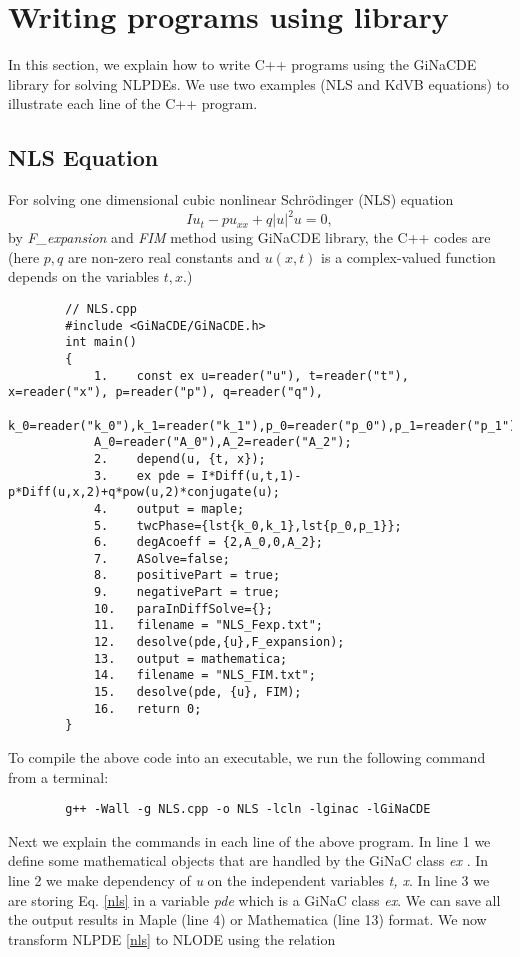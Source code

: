 \documentclass[prd,aps,floats,showkeys,nofootinbib,notitlepage]{revtex4}
\begin{document}
	\section{Writing programs using library}\label{sec:examples} 
	In this section, we explain how to write C++ programs using the GiNaCDE library for solving NLPDEs. We use two examples (NLS and KdVB equations) to illustrate each line of the C++ program.
	\subsection{NLS Equation}
	For solving one dimensional cubic nonlinear Schrödinger (NLS) equation %
	\begin{equation}\label{nls}
		Iu_t-pu_{xx}+q{|u|}^2u=0,
	\end{equation}
	by {\em F\_expansion} and {\em FIM} method using GiNaCDE library, the C++ codes are (here $p,q$ are non-zero real constants and $u(x,t)$ is a complex-valued function depends on the variables $t,x$.)\\
	\begin{verbatim}
		// NLS.cpp
		#include <GiNaCDE/GiNaCDE.h>
		int main()
		{
			1.    const ex u=reader("u"), t=reader("t"), x=reader("x"), p=reader("p"), q=reader("q"),
			k_0=reader("k_0"),k_1=reader("k_1"),p_0=reader("p_0"),p_1=reader("p_1"), 
			A_0=reader("A_0"),A_2=reader("A_2");   
			2.    depend(u, {t, x});
			3.    ex pde = I*Diff(u,t,1)-p*Diff(u,x,2)+q*pow(u,2)*conjugate(u);
			4.    output = maple;  
			5.    twcPhase={lst{k_0,k_1},lst{p_0,p_1}};
			6.    degAcoeff = {2,A_0,0,A_2};
			7.    ASolve=false;
			8.    positivePart = true; 
			9.    negativePart = true;
			10.   paraInDiffSolve={};
			11.   filename = "NLS_Fexp.txt";
			12.   desolve(pde,{u},F_expansion);
			13.   output = mathematica;
			14.   filename = "NLS_FIM.txt";
			15.   desolve(pde, {u}, FIM);
			16.   return 0;
		}
	\end{verbatim}
	To compile the above code into an executable, we run the following command from a terminal:
	\begin{verbatim}
		g++ -Wall -g NLS.cpp -o NLS -lcln -lginac -lGiNaCDE
	\end{verbatim}
	Next we explain the commands in each line of the above program.
	In line 1 we define some mathematical objects that are handled by the GiNaC class {\em ex} \cite{ginac}. In line 2 we make dependency of {\em u} on the independent variables {\em t, x}. In line 3 we are storing Eq. \eqref{nls} in a variable {\em pde} which is a GiNaC class {\em ex}. We can save all the output results in {Maple} (line 4) or {Mathematica} (line 13) format. We now transform NLPDE \eqref{nls} to NLODE using the relation 
\end{document}
